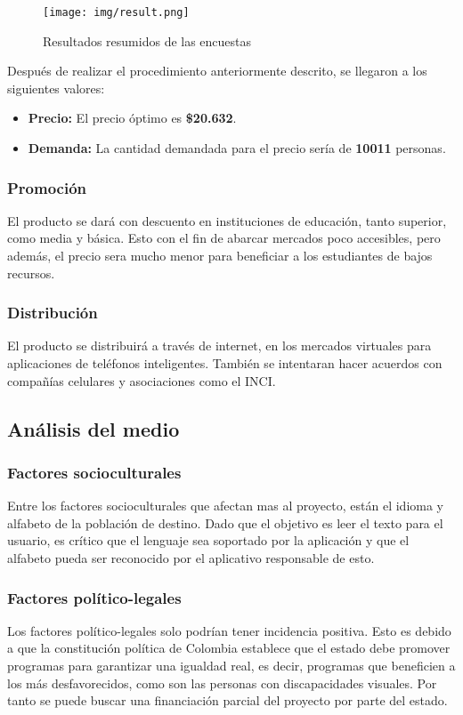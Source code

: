 \documentclass[a4paper, 12pt, oneside]{article}
\begin{document}
	\begin{figure}[htb]
	\begin{center}
	\leavevmode
	\texttt{[image: img/result.png]}
	\end{center}
	\caption{Resultados resumidos de las encuestas}
	\label{fig:result}
	\end{figure}
	
	Después de realizar el procedimiento anteriormente descrito, se llegaron a los siguientes valores:
	\begin{itemize}
		\item {\bf Precio:} El precio óptimo es {\bf \$20.632}.
		\item {\bf Demanda:} La cantidad demandada para el precio sería de {\bf 10011} personas.
	\end{itemize}

	\subsubsection{Promoción}
	El producto se dará con descuento en instituciones de educación, tanto superior, como media y básica. Esto con el fin de abarcar mercados poco accesibles, pero además, el precio sera
	mucho menor para beneficiar a los estudiantes de bajos recursos.
	
	\subsubsection{Distribución}
	El producto se distribuirá a través de internet, en los mercados virtuales para aplicaciones de teléfonos inteligentes. También se intentaran hacer acuerdos con compañías celulares y
	asociaciones como el INCI.

	\subsection{Análisis del medio}

	\subsubsection{Factores socioculturales}
	Entre los factores socioculturales que afectan mas al proyecto, están el idioma y alfabeto de la población de destino. Dado que el objetivo es leer el texto para el usuario, es crítico que el lenguaje sea soportado por la aplicación y que el alfabeto pueda ser reconocido por el aplicativo responsable de esto.
	
	\subsubsection{Factores político-legales}
	Los factores político-legales solo podrían tener incidencia positiva. Esto es debido a que la constitución política de Colombia establece que el estado debe promover programas para	garantizar una igualdad real, es decir, programas que beneficien a los más desfavorecidos, como son las personas con discapacidades visuales. Por tanto se puede buscar una financiación parcial del proyecto por parte del estado.
	
\end{document}
